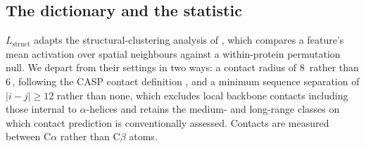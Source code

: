 \documentclass{article} %
\newcommand{\Lstruct}{\ensuremath{L_{\mathrm{struct}}}}
\newcommand{\angstrom}{\text{\AA}}
\begin{document}
\subsection{The dictionary and the statistic}
\label{sec:statistic}

\Lstruct{} adapts the structural-clustering analysis of \citet{simon2025interplm}, which compares
a feature's mean activation over spatial neighbours against a within-protein permutation null. We
depart from their settings in two ways: a contact radius of 8\,\angstrom{} rather than
6\,\angstrom, following the CASP contact definition \citep{schaarschmidt2018assessment}, and a
minimum sequence separation of $|i - j| \ge 12$ rather than none, which excludes local backbone
contacts including those internal to $\alpha$-helices \citep{marks2011protein,morcos2011direct}
and retains the medium- and long-range classes on which contact prediction is conventionally
assessed. Contacts are measured between C$\alpha$ rather than C$\beta$ atoms.
\end{document}
